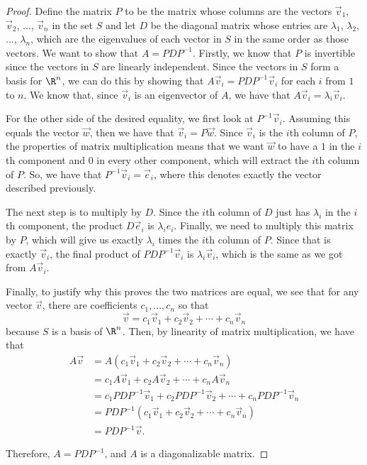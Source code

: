 \begin{proof}
Define the matrix $P$ to be the matrix whose columns are the vectors $\vec{v}_1$, $\vec{v}_2$, ..., $\vec{v}_n$ in the set $S$ and let $D$ be the diagonal matrix whose entries are $\lambda_1$, $\lambda_2$, ..., $\lambda_n$, which are the eigenvalues of each vector in $S$ in the same order as those vectors. We want to show that $A = PDP^{-1}$. Firstly, we know that $P$ is invertible since the vectors in $S$ are linearly independent. Since the vectors in $S$ form a basis for $\R^n$, we can do this by showing that $A\vec{v}_i = PDP^{-1}\vec{v}_i$ for each $i$ from $1$ to $n$. We know that, since $\vec{v}_i$ is an eigenvector of $A$, we have that $A\vec{v}_i = \lambda_i\vec{v}_i$. 

For the other side of the desired equality, we first look at $P^{-1}\vec{v}_i$. Assuming this equals the vector $\vec{w}$, then we have that $\vec{v}_i = P\vec{w}$. Since $\vec{v}_i$ is the $i$th column of $P$, the properties of matrix multiplication means that we want $\vec{w}$ to have a $1$ in the $i$th component and $0$ in every other component, which will extract the $i$th column of $P$. So, we have that $P^{-1}\vec{v}_i = \vec{e}_i$, where this denotes exactly the vector described previously.

The next step is to multiply by $D$. Since the $i$th column of $D$ just has $\lambda_i$ in the $i$th component, the product $D\vec{e}_i$ is $\lambda_ie_i$. Finally, we need to multiply this matrix by $P$, which will give us exactly $\lambda_i$ times the $i$th column of $P$. Since that is exactly $\vec{v}_i$, the final product of $PDP^{-1}\vec{v}_i$ is $\lambda_i\vec{v}_i$, which is the same as we got from $A\vec{v}_i$.  

Finally, to justify why this proves the two matrices are equal, we see that for any vector $\vec{v}$, there are coefficients $c_1, ..., c_n$ so that
\[ \vec{v} = c_1\vec{v}_1 + c_2\vec{v}_2 + \cdots + c_n\vec{v}_n \] because $S$ is a basis of $\R^n$. Then, by linearity of matrix multiplication, we have that
\[ 
\begin{split}
A\vec{v} &= A\left(c_1\vec{v}_1 + c_2\vec{v}_2 + \cdots + c_n\vec{v}_n\right) \\
&= c_1A\vec{v}_1 + c_2A\vec{v}_2 + \cdots + c_nA\vec{v}_n \\
&= c_1PDP^{-1}\vec{v}_1 + c_2PDP^{-1}\vec{v}_2 + \cdots + c_nPDP^{-1}\vec{v}_n \\
&= PDP^{-1}\left(c_1\vec{v}_1 + c_2\vec{v}_2 + \cdots + c_n\vec{v}_n\right) \\
&= PDP^{-1}\vec{v}.
\end{split}
\]

Therefore, $A = PDP^{-1}$, and $A$ is a diagonalizable matrix.
\end{proof}

